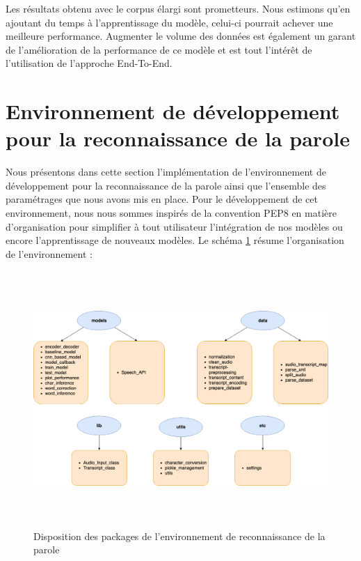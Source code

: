 Les résultats obtenu avec le corpus élargi sont prometteurs. Nous estimons qu'en ajoutant du temps à l'apprentissage du modèle, celui-ci pourrait achever une meilleure performance. Augmenter le volume des données est également un garant de l'amélioration de la performance de ce modèle et est tout l'intérêt de l'utilisation de l'approche End-To-End.

\section{Environnement de développement pour la reconnaissance de la parole}
Nous présentons dans cette section l'implémentation de l'environnement de développement pour la reconnaissance de la parole ainsi que l'ensemble des paramétrages que nous avons mis en place. Pour le développement de cet environnement, nous nous sommes inspirés de la convention PEP8 en matière d'organisation pour simplifier à tout utilisateur l'intégration de nos modèles ou encore l'apprentissage de nouveaux modèles. Le schéma \ref{env_dev} résume l'organisation de l'environnement :

 \begin{figure}[H]
     \centering
     \includegraphics[height=275pt,width=400pt]{images/chap4/engine_packages.png}
     \caption{Disposition des packages de l'environnement de reconnaissance de la parole}
     \label{env_dev}
 \end{figure}

